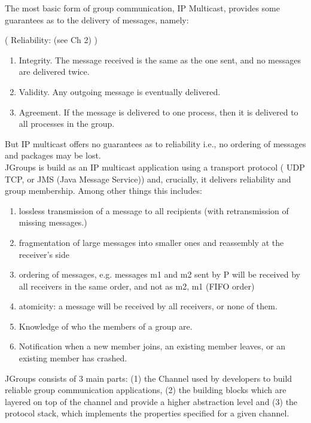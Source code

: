The most basic form of group communication, IP Multicast, provides some guarantees as to the delivery of messages, namely:

( Reliability: (see Ch 2) )

\begin{enumerate}
\item Integrity. The message received is the same as the one sent, and no messages are delivered twice. 
\item Validity. Any outgoing  message is eventually delivered.
\item Agreement. If the message is delivered to one process, then it is delivered to all processes in the group.
\end{enumerate}

But IP multicast offers no guarantees as to reliability i.e., no ordering of messages and packages may be lost. \\

JGroups is build as an IP multicast application using a transport protocol ( UDP TCP, or JMS (Java Message Service)) 
and, crucially,  it delivers reliability and group membership. Among other things this includes:\\
\begin{enumerate}
\item lossless transmission of a message to all recipients (with retransmission of missing messages.)
\item fragmentation of large messages into smaller ones and reassembly at the receiver's side
\item ordering of messages, e.g. messages m1 and m2 sent by P will be received by all receivers in the same order, and not as m2, m1 (FIFO order)
\item atomicity: a message will be received by all receivers, or none of them.
\item Knowledge of who the members of a group are. 
\item Notification when a new member joins, an existing member leaves, or an existing member has crashed.
\end{enumerate}

JGroups consists of 3 main parts: (1) the Channel used by developers to build reliable group communication applications, (2) the building blocks which are layered on top of the channel and provide a higher abstraction level and (3) the protocol stack, which implements the properties specified for a given channel.\\

